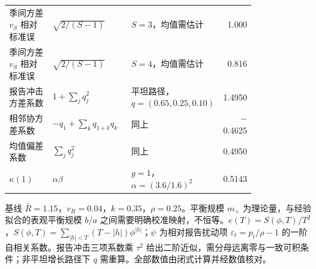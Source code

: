 \begin{table}[htbp]
\begin{tabular}{p{0.2\linewidth}p{0.33\linewidth}p{0.27\linewidth}r}
季间方差 $v_S$ 相对标准误 & $\sqrt{2/(S-1)}$ & $S=3$，均值需估计 & 1.000 \\
季间方差 $v_S$ 相对标准误 & $\sqrt{2/(S-1)}$ & $S=4$，均值需估计 & 0.816 \\
报告冲击方差系数 & $1+\sum_jq_j^2$ & 平坦路径，$q=(0.65,0.25,0.10)$ & 1.4950 \\
相邻协方差系数 & $-q_1+\sum_kq_{1+k}q_k$ & 同上 & $-$0.4625 \\
均值偏差系数 & $\sum_jq_j^2$ & 同上 & 0.4950 \\
$\kappa(1)$ & $\alpha\beta$ & $g=1$，$\alpha=(3.6/1.6)^2$ & 0.5143 \\
\bottomrule
\end{tabular}
\par\smallskip
\begin{minipage}{0.95\linewidth}\scriptsize 基线 $\bar R=1.15$，$v_R=0.04$，$k=0.35$，$\rho=0.25$。平衡规模 $m_\times$ 为理论量，与经验拟合的表观平衡规模 $b/a$ 之间需要明确校准映射，不恒等。$e(T)=S(\phi,T)/T^2$，$S(\phi,T)=\sum_{|h|<T}(T-|h|)\phi^{|h|}$；$\psi$ 为相对报告扰动项 $\varepsilon_t=p_t/\rho-1$ 的一阶自相关系数。报告冲击三项系数乘 $\tau^2$ 给出二阶近似，需分母远离零与一致可积条件；非平坦增长路径下 $q$ 需重算。全部数值由闭式计算并经数值核对。\end{minipage}
\end{table}
